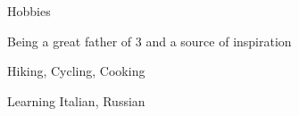 \begin{cventries}
  \cventry
{Hobbies} %
{} %
{} %
{} %
{
	\begin{cvitems} %
		\item {Being a great father of 3 and a source of inspiration}
		\item {Hiking, Cycling, Cooking}
		\item {Learning Italian, Russian}
	\end{cvitems}
}

\end{cventries}
